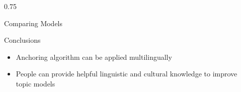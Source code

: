 \documentclass[final, 20pt]{beamer}
\newlength{\colwidth}
\newlength{\edgewidth}
\newcommand{\edgecolumn}{\begin{column}{\edgewidth}\end{column}}
\begin{document}
\begin{frame}[t]
\begin{columns}[t]
\begin{column}{0.75\colwidth}
\begin{block}{Comparing Models}
  \end{block}

\begin{block}{Conclusions}
	\begin{itemize}
		\item Anchoring algorithm can be applied multilingually
		\item People can provide helpful linguistic and cultural knowledge to improve topic models
	\end{itemize}
\end{block}



\end{column}

\edgecolumn




\end{columns}
\end{frame}
\end{document}
